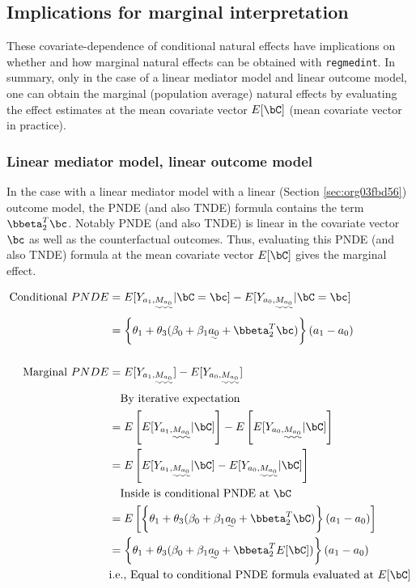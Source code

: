 \documentclass[10pt]{article}
\begin{document}
\subsection{Implications for marginal interpretation}
\label{sec:orgdabaa15}
These covariate-dependence of conditional natural effects have implications on whether and how marginal natural effects can be obtained with \texttt{regmedint}. In summary, only in the case of a linear mediator model and linear outcome model, one can obtain the marginal (population average) natural effects by evaluating the effect estimates at the mean covariate vector \(E[\bC]\) (mean covariate vector in practice).

\subsubsection{Linear mediator model, linear outcome model}
\label{sec:org77cab29}
In the case with a linear mediator model with a linear (Section \ref{sec:org03fbd56}) outcome model, the PNDE (and also TNDE) formula contains the term \(\bbeta_{2}^{T}\bc\). Notably PNDE (and also TNDE) is linear in the covariate vector \(\bc\) as well as the counterfactual outcomes. Thus, evaluating this PNDE (and also TNDE) formula at the mean covariate vector \(E[\bC]\) gives the marginal effect.

\begin{align*}
  \text{Conditional }PNDE
  &= E[Y_{a_{1},\uwave{M_{a_{0}}}} | \bC = \bc] - E[Y_{a_{0},\uwave{M_{a_{0}}}} | \bC = \bc]\\
  &= \left\{ \theta_{1} + \theta_{3}(\beta_{0} + \beta_{1}\uwave{a_{0}} + \bbeta_{2}^{T}\bc) \right\} (a_{1} - a_{0})\\
  \\
  \text{Marginal }PNDE
  &= E[Y_{a_{1},\uwave{M_{a_{0}}}}] - E[Y_{a_{0},\uwave{M_{a_{0}}}}]\\
  &~~~\text{By iterative expectation}\\
  &= E \left[ E[Y_{a_{1},\uwave{M_{a_{0}}}} | \bC] \right] -
     E \left[ E[Y_{a_{0},\uwave{M_{a_{0}}}} | \bC] \right]\\
  &= E \left[ E[Y_{a_{1},\uwave{M_{a_{0}}}} | \bC] - E[Y_{a_{0},\uwave{M_{a_{0}}}} | \bC] \right]\\
  &~~~\text{Inside is conditional PNDE at } \bC\\
  &= E\left[ \left\{ \theta_{1} + \theta_{3}(\beta_{0} + \beta_{1}\uwave{a_{0}} + \bbeta_{2}^{T}\bC) \right\} (a_{1} - a_{0}) \right]\\
  &= \left\{ \theta_{1} + \theta_{3}(\beta_{0} + \beta_{1}\uwave{a_{0}} + \bbeta_{2}^{T}E[\bC]) \right\} (a_{1} - a_{0})\\
  &\text{i.e., Equal to conditional PNDE formula evaluated at } E[\bC]\\
\end{align*}
\end{document}
